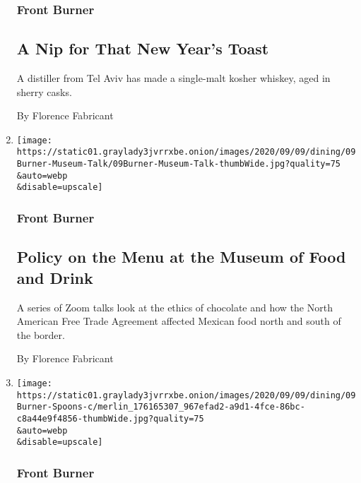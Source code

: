 \begin{enumerate}
  \hypertarget{front-burner-1}{%
  \subsubsection{Front Burner}\label{front-burner-1}}

  \hypertarget{a-nip-for-that-new-years-toast}{%
  \subsection{A Nip for That New Year's
  Toast}\label{a-nip-for-that-new-years-toast}}

  A distiller from Tel Aviv has made a single-malt kosher whiskey, aged
  in sherry casks.

  By Florence Fabricant
\item
  \href{/2020/09/07/dining/mofad-talks.html}{}

  \texttt{[image: https://static01.graylady3jvrrxbe.onion/images/2020/09/09/dining/09Burner-Museum-Talk/09Burner-Museum-Talk-thumbWide.jpg?quality=75\\\&auto=webp\\\&disable=upscale]}

  \hypertarget{front-burner-2}{%
  \subsubsection{Front Burner}\label{front-burner-2}}

  \hypertarget{policy-on-the-menu-at-the-museum-of-food-and-drink}{%
  \subsection{Policy on the Menu at the Museum of Food and
  Drink}\label{policy-on-the-menu-at-the-museum-of-food-and-drink}}

  A series of Zoom talks look at the ethics of chocolate and how the
  North American Free Trade Agreement affected Mexican food north and
  south of the border.

  By Florence Fabricant
\item
  \href{/2020/09/07/dining/drinks/cocktail-measuring-spoons.html}{}

  \texttt{[image: https://static01.graylady3jvrrxbe.onion/images/2020/09/09/dining/09Burner-Spoons-c/merlin\_176165307\_967efad2-a9d1-4fce-86bc-c8a44e9f4856-thumbWide.jpg?quality=75\\\&auto=webp\\\&disable=upscale]}

  \hypertarget{front-burner-3}{%
  \subsubsection{Front Burner}\label{front-burner-3}}


\end{enumerate}
